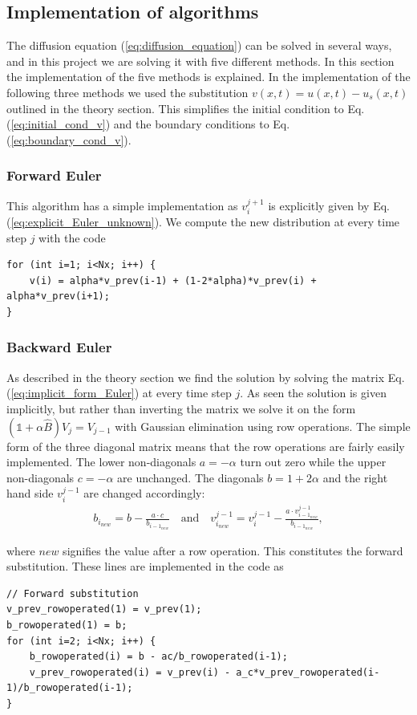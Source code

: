 \documentclass[12pt]{article}
\begin{document}
\begin{flushleft}
\subsection{Implementation of algorithms}
The diffusion equation (\ref{eq:diffusion_equation}) can be solved in several ways, and in this project we are solving it with five different methods. In this section the implementation of the five methods is explained. In the implementation of the following three methods we used the substitution $v(x, t) = u(x, t) - u_s(x,t)$ outlined in the theory section. This simplifies the initial condition to Eq. (\ref{eq:initial_cond_v}) and the boundary
conditions to Eq. (\ref{eq:boundary_cond_v}).
\subsubsection{Forward Euler}
This algorithm has a simple implementation as $v_{i}^{j+1}$ is explicitly given by Eq. (\ref{eq:explicit_Euler_unknown}).
We compute the new distribution at every time step $j$ with the code
\begin{lstlisting}
for (int i=1; i<Nx; i++) {
    v(i) = alpha*v_prev(i-1) + (1-2*alpha)*v_prev(i) + alpha*v_prev(i+1);
}
\end{lstlisting}
\subsubsection{Backward Euler}
As described in the theory section we find the solution by solving the matrix
Eq. (\ref{eq:implicit_form_Euler}) at every time step $j$. As seen the solution is given implicitly, but
rather than inverting the matrix we solve it on the form $(\mathbb{1}+\alpha\hat{B})V_{j} = V_{j-1}$
with Gaussian elimination using row operations.
The simple form of the three diagonal matrix means that the row operations are fairly easily implemented.
The lower non-diagonals $a=-\alpha$ turn out zero while the upper non-diagonals $c=-\alpha$ are unchanged. 
The diagonals $b = 1 + 2\alpha$ and the right hand side $v_i^{j-1}$ are changed accordingly:
\vspace{5mm}
\begin{align*}
b_{i_{new}} = b - \frac{a \cdot c}{b_{{i-1}_{new}}}\quad\text{and}\quad
v_{i_{new}}^{j-1} = v_i^{j-1} - \frac{a\cdot v_{{i-1}_{new}}^{j-1}}{b_{{i-1}_{new}}},
\end{align*}
\vspace{5mm}


where $new$ signifies the value after a row operation. This constitutes the forward substitution.
These lines are implemented in the code as
\begin{lstlisting}
// Forward substitution
v_prev_rowoperated(1) = v_prev(1);
b_rowoperated(1) = b;
for (int i=2; i<Nx; i++) {
    b_rowoperated(i) = b - ac/b_rowoperated(i-1);
    v_prev_rowoperated(i) = v_prev(i) - a_c*v_prev_rowoperated(i-1)/b_rowoperated(i-1);
}
\end{lstlisting}


\end{flushleft}
\end{document}
